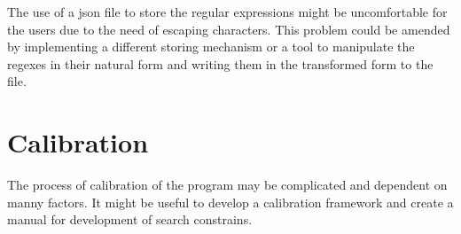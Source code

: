 \documentclass[a4paper,twoside,12pt]{book}
\newcounter{PagesWithoutNumbers}
\begin{document}
The use of a json file to store the regular expressions might be uncomfortable for the users due to the need of escaping characters. 
This problem could be amended by implementing a different storing mechanism or a tool to manipulate the regexes in their natural form 
and writing them in the transformed form to the file. 

\section{Calibration}

The process of calibration of the program may be complicated and dependent on manny factors. It might be 
useful to develop a calibration framework and create a manual for development of search constrains.



 

 


\backmatter
{}
\setcounter{page}{\value{PagesWithoutNumbers}}

\pagestyle{onlyPageNumbers}




\end{document}
